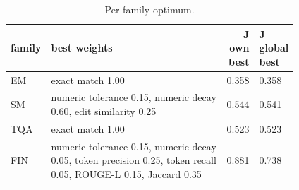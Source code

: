 \begin{table}[htbp]
\centering\scriptsize
\caption{Per-family optimum.}
\label{tab:per_family}
\setlength{\tabcolsep}{3pt}
\begin{tabular}{lp{0.729\linewidth}rp{0.085\linewidth}}
\toprule
family & best weights & J own best & J global best \\
\midrule
EM & exact match 1.00 & 0.358 & 0.358 \\
SM & numeric tolerance 0.15, numeric decay 0.60, edit similarity 0.25 & 0.544 & 0.541 \\
TQA & exact match 1.00 & 0.523 & 0.523 \\
FIN & numeric tolerance 0.15, numeric decay 0.05, token precision 0.25, token recall 0.05, ROUGE-L 0.15, Jaccard 0.35 & 0.881 & 0.738 \\
\bottomrule
\end{tabular}
\end{table}
